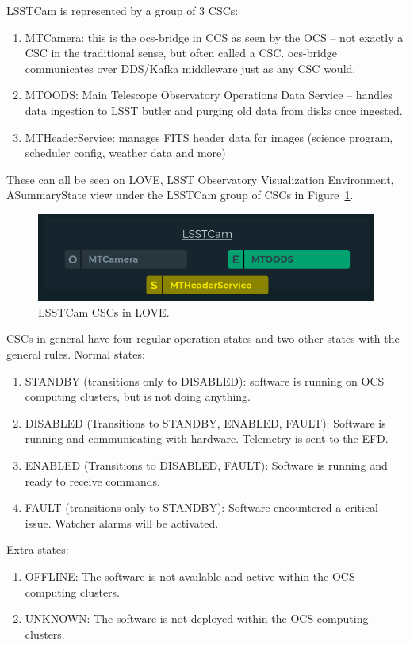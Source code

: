 LSSTCam is represented by a group of 3 CSCs:
\begin{enumerate}
    \item MTCamera: this is the ocs-bridge in CCS as seen by the OCS -- not exactly a CSC in the traditional sense, but  often called a CSC. ocs-bridge communicates over DDS/Kafka middleware just as any CSC would.
    \item MTOODS: Main Telescope Observatory Operations Data Service -- handles data ingestion to LSST butler and purging old data from disks once ingested.
    \item MTHeaderService: manages FITS header data for images (science program, scheduler config, weather data and more)
\end{enumerate}

These can all be seen on LOVE, LSST Observatory Visualization Environment, ASummaryState view under the LSSTCam group of CSCs in Figure~\ref{fig:app:lsstcamcsc}.
\begin{figure}
    \centering
    \includegraphics[width=0.6\linewidth]{figures/appendixFigs/lsstcamcsc.png}
    \caption{LSSTCam CSCs in LOVE.}
    \label{fig:app:lsstcamcsc}
\end{figure}

CSCs in general have four regular operation states and two other states with the general rules. Normal states:
\begin{enumerate}
    \item STANDBY (transitions only to DISABLED): software is running on OCS computing clusters, but is not doing anything.
    \item DISABLED (Transitions to STANDBY, ENABLED, FAULT): Software is running and communicating with hardware. Telemetry is sent to the EFD.
    \item ENABLED (Transitions to DISABLED, FAULT): Software is running and ready to receive commands.
    \item FAULT (transitions only to STANDBY): Software encountered a critical issue. Watcher alarms will be activated.
\end{enumerate}
Extra states:
\begin{enumerate}
    \item OFFLINE: The software is not available and active within the OCS computing clusters. 
    \item UNKNOWN: The software is not deployed within the OCS computing clusters. 
\end{enumerate}

